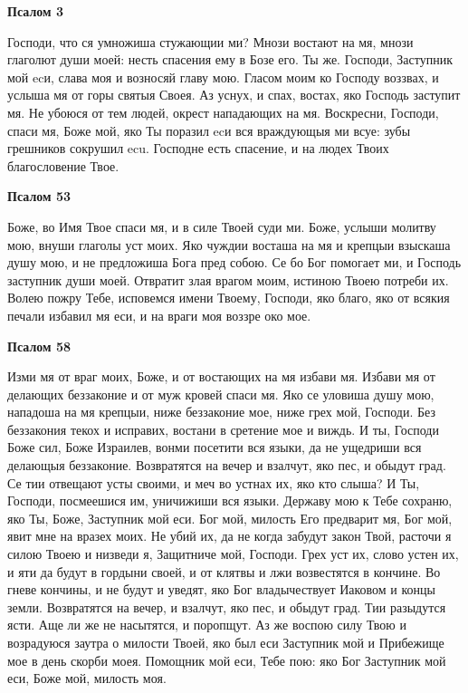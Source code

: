


 

 


\bfseries Псалом 3\normalfont{}\nopagebreak


Господи, что ся умножиша стужающии ми? Мнози востают на мя, мнози глаголют души моей: несть спасения ему в Бозе его. Ты же. Господи, Заступник мой ecи, слава моя и возносяй главу мою. Гласом моим ко Господу воззвах, и услыша мя от горы святыя Своея. Аз уснух, и спах, востах, яко Господь заступит мя. Не убоюся от тем людей, окрест нападающих на мя. Воскресни, Господи, спаси мя, Боже мой, яко Ты поразил ecи вся враждующыя ми всуе: зубы грешников сокрушил ecu. Господне есть спасение, и на людех Твоих благословение Твое.


\medskip


\bfseries Псалом 53\normalfont{}\nopagebreak


Боже, во Имя Твое спаси мя, и в силе Твоей суди ми. Боже, услыши молитву мою, внуши глаголы уст моих. Яко чуждии восташа на мя и крепцыи взыскаша душу мою, и не предложиша Бога пред собою. Се бо Бог помогает ми, и Господь заступник души моей. Отвратит злая врагом моим, истиною Твоею потреби их. Волею пожру Тебе, исповемся имени Твоему, Господи, яко благо, яко от всякия печали избавил мя еси, и на враги моя воззре око мое.


\medskip


\bfseries Псалом 58\normalfont{}\nopagebreak


Изми мя от враг моих, Боже, и от востающих на мя избави мя. Избави мя от делающих беззаконие и от муж кровей спаси мя. Яко се уловиша душу мою, нападоша на мя крепцыи, ниже беззаконие мое, ниже грех мой, Господи. Без беззакония текох и исправих, востани в сретение мое и виждь. И ты, Господи Боже сил, Боже Израилев, вонми посетити вся языки, да не ущедриши вся делающыя беззаконие. Возвратятся на вечер и взалчут, яко пес, и обыдут град. Се тии отвещают усты своими, и меч во устнах их, яко кто слыша? И Ты, Господи, посмеешися им, уничижиши вся языки. Державу мою к Тебе сохраню, яко Ты, Боже, Заступник мой еси. Бог мой, милость Его предварит мя, Бог мой, явит мне на вразех моих. Не убий их, да не когда забудут закон Твой, расточи я силою Твоею и низведи я, Защитниче мой, Господи. Грех уст их, слово устен их, и яти да будут в гордыни своей, и от клятвы и лжи возвестятся в кончине. Во гневе кончины, и не будут и уведят, яко Бог владычествует Иаковом и концы земли. Возвратятся на вечер, и взалчут, яко пес, и обыдут град. Тии разыдутся ясти. Аще ли же не насытятся, и поропщут. Аз же воспою силу Твою и возрадуюся заутра о милости Твоей, яко был еси Заступник мой и Прибежище мое в день скорби моея. Помощник мой еси, Тебе пою: яко Бог Заступник мой еси, Боже мой, милость моя.


